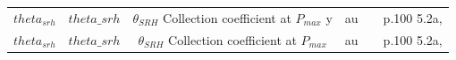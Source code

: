 \begin{landscape}
\begin{center}
\begin{tabular}{ |c|c|c|c| c| c|}
$theta_{srh}$ 	&$theta\_{srh}$ & $\theta_{SRH}$ Collection coefficient at $P_{max}$ y & au &&p.100 5.2a\cite{Summon-FETCH-bonn_catalog_45326403},\cite{PhysRevApplied.6.024001}\\
$theta_{srh}$ 	&$theta\_{srh}$ & $\theta_{SRH}$ Collection coefficient at $P_{max}$ & au &&p.100 5.2a\cite{Summon-FETCH-bonn_catalog_45326403},\cite{PhysRevApplied.6.024001}\\


\hline
\end{tabular}

\end{center}

\end{landscape}


